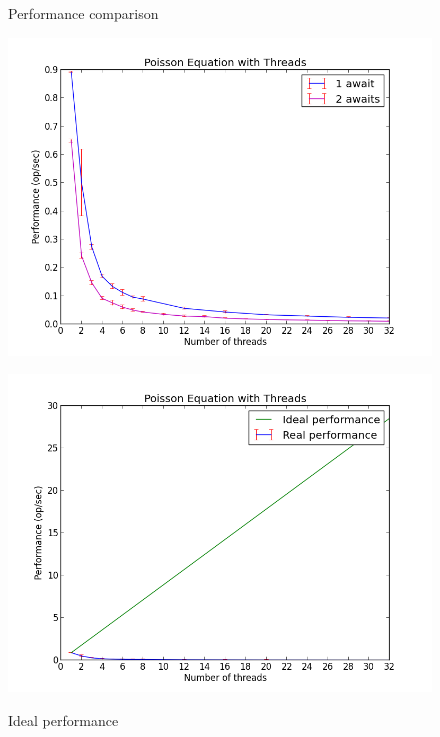 \documentclass{article}
\begin{document}
\begin{figure}
\centering
\begin{minipage}{0.47\textwidth}
  \centering
  \caption{Performance comparison}
  \includegraphics[width=1\linewidth, natwidth=800, natheight=600]{graphs/comparison_performance.png}
  \label{fig:comp-perf}
\end{minipage}
\begin{minipage}{0.47\textwidth}
  \centering
  \caption{Ideal performance}
  \includegraphics[width=1\linewidth, natwidth=800, natheight=600]{graphs/ideal_performance.png}
  \label{fig:ideal-perf}
\end{minipage}
\end{figure}
\end{document}

